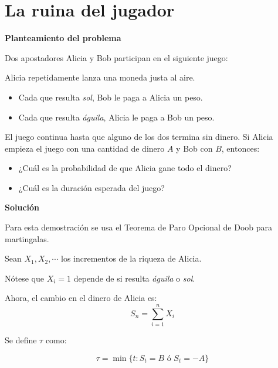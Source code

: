 \chapter{La ruina del jugador}\label{chap:ruina}


\textbf{Planteamiento del problema}
 
Dos apostadores Alicia y Bob participan en el siguiente juego:

Alicia repetidamente lanza una moneda justa al aire. 
\begin{itemize}

	\item Cada que resulta \emph{sol}, Bob le paga a Alicia un peso.

	\item Cada que resulta \emph{águila}, Alicia le paga a Bob un peso.

\end{itemize}

El juego continua hasta que alguno de los dos termina sin dinero.
Si Alicia empieza el juego con una cantidad de dinero $A$ y Bob con $B$, entonces:
\begin{itemize}

	\item ¿Cuál es la probabilidad de que Alicia gane todo el dinero?

	\item ¿Cuál es la duración esperada del juego?

\end{itemize}

\textbf{Solución}

Para esta demostración se usa el Teorema de Paro Opcional de Doob para martingalas.

Sean $X_1,X_2,\cdots$ los incrementos de la riqueza de Alicia. 

Nótese que $X_i= 1$ depende de si resulta \emph{águila} o \emph{sol}.

Ahora, el cambio en el dinero de Alicia es:
\[S_n = \sum_{i=1}^n X_i\]

Se define $\tau$ como:

\[\tau = \min\{t: S_t = B \mbox{ ó } S_t = -A \}\]


